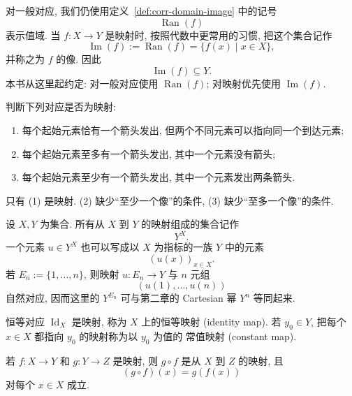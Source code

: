 \documentclass[usesamecnt, thmcnt=section, lang=cn, newtx, 10pt, scheme=chinese]{elegantbook}
\begin{document}
\begin{notation}[映射的像]\label{not:corr-mapping-image}
对一般对应, 我们仍使用定义~\ref{def:corr-domain-image} 中的记号
\[
 \operatorname{Ran}(f)
\]
表示值域. 当 $f:X\to Y$ 是映射时, 按照代数中更常用的习惯, 把这个集合记作
\[
 \operatorname{Im}(f)
 :=\operatorname{Ran}(f)
 =\{f(x)\mid x\in X\},
\]
并称之为 $f$ 的{\color{blue}像}. 因此
\[
 \operatorname{Im}(f)\subseteq Y.
\]
本书从这里起约定: 对一般对应使用 $\operatorname{Ran}(f)$; 对映射优先使用 $\operatorname{Im}(f)$.
\end{notation}

\begin{concept}\label{con:corr-09}
判断下列对应是否为映射:
\begin{enumerate}[label=\rm(\arabic*)]
  \item 每个起始元素恰有一个箭头发出, 但两个不同元素可以指向同一个到达元素;
  \item 每个起始元素至多有一个箭头发出, 其中一个元素没有箭头;
  \item 每个起始元素至少有一个箭头发出, 其中一个元素发出两条箭头.
\end{enumerate}
\end{concept}

\begin{solution}
只有 (1) 是映射. (2) 缺少``至少一个像''的条件, (3) 缺少``至多一个像''的条件.
\end{solution}

\begin{notation}[映射集合]\label{not:corr-mapping-space}
设 $X,Y$ 为集合. 所有从 $X$ 到 $Y$ 的映射组成的集合记作
\[
 Y^X.
\]
一个元素 $u\in Y^X$ 也可以写成以 $X$ 为指标的一族 $Y$ 中的元素
\[
 (u(x))_{x\in X}.
\]
若 $E_n:=\{1,\ldots,n\}$, 则映射 $u:E_n\to Y$ 与 $n$ 元组
\[
 (u(1),\ldots,u(n))
\]
自然对应, 因而这里的 $Y^{E_n}$ 可与第二章的 Cartesian 幂 $Y^n$ 等同起来.
\end{notation}

\begin{instance}
恒等对应 $\operatorname{Id}_X$ 是映射, 称为 $X$ 上的{\color{blue}恒等映射 (identity map)}. 若 $y_0\in Y$, 把每个 $x\in X$ 都指向 $y_0$ 的映射称为以 $y_0$ 为值的 {\color{blue}常值映射 (constant map)}.
\end{instance}

\begin{proposition}\label{prop:corr-composition-mappings}
若 $f:X\to Y$ 和 $g:Y\to Z$ 是映射, 则 $g\circ f$ 是从 $X$ 到 $Z$ 的映射, 且
\[
 (g\circ f)(x)=g(f(x))
\]
对每个 $x\in X$ 成立.
\end{proposition}
\end{document}
